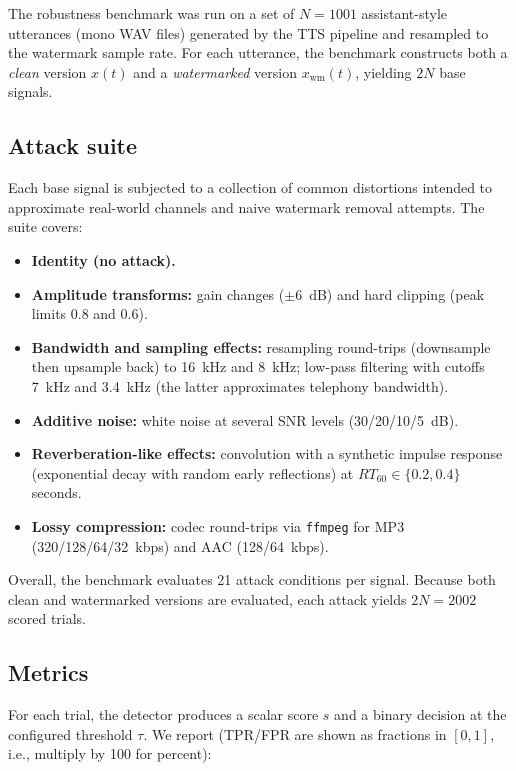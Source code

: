 The robustness benchmark was run on a set of $N=1001$ assistant-style
utterances (mono WAV files) generated by the TTS pipeline and resampled to the
watermark sample rate. For each utterance, the benchmark constructs both a
\emph{clean} version $x(t)$ and a \emph{watermarked} version
$x_{\mathrm{wm}}(t)$, yielding $2N$ base signals.

\subsection{Attack suite}
\label{subsec:wm-attacks}

Each base signal is subjected to a collection of common distortions intended to
approximate real-world channels and naive watermark removal attempts. The suite
covers:

\begin{itemize}
    \item \textbf{Identity (no attack).}
    \item \textbf{Amplitude transforms:} gain changes ($\pm 6$~dB) and hard
    clipping (peak limits 0.8 and 0.6).
    \item \textbf{Bandwidth and sampling effects:} resampling round-trips
    (downsample then upsample back) to 16~kHz and 8~kHz; low-pass filtering
    with cutoffs 7~kHz and 3.4~kHz (the latter approximates telephony
    bandwidth).
    \item \textbf{Additive noise:} white noise at several SNR levels
    (30/20/10/5~dB).
    \item \textbf{Reverberation-like effects:} convolution with a synthetic
    impulse response (exponential decay with random early reflections) at
    $RT_{60}\in\{0.2,0.4\}$ seconds.
    \item \textbf{Lossy compression:} codec round-trips via \texttt{ffmpeg} for
    MP3 (320/128/64/32~kbps) and AAC (128/64~kbps).
\end{itemize}

Overall, the benchmark evaluates 21 attack conditions per signal. Because both
clean and watermarked versions are evaluated, each attack yields
$2N=2002$ scored trials.

\subsection{Metrics}
\label{subsec:wm-metrics}

For each trial, the detector produces a scalar score $s$ and a binary decision at
the configured threshold $\tau$. We report (TPR/FPR are shown as fractions in $[0,1]$, i.e., multiply by 100 for percent):

